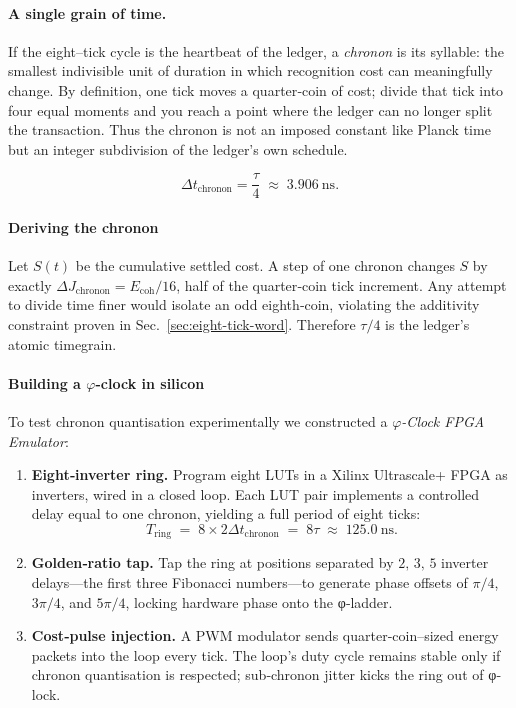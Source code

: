 \documentclass[11pt,oneside]{book}
\begin{document}
\paragraph*{A single grain of time.}
If the eight–tick cycle is the heartbeat of the ledger, a \emph{chronon}
is its syllable: the smallest indivisible unit of duration in which
recognition cost can meaningfully change.  
By definition, one tick moves a quarter‐coin of cost; divide that tick
into four equal moments and you reach a point where the ledger can no
longer split the transaction.  
Thus the chronon is not an imposed constant like Planck time but an
integer subdivision of the ledger’s own schedule.

\[
  \boxed{\;
  \Delta t_{\text{chronon}} = \frac{\tau}{4}
  \;\approx\; 3.906\ \text{ns} .
  \;}
\]

\paragraph*{Deriving the chronon}

Let \(S(t)\) be the cumulative settled cost.  
A step of one chronon changes $S$ by exactly
\(
  \Delta J_{\text{chronon}} = E_{\text{coh}}/16
\),
half of the quarter‐coin tick increment.  
Any attempt to divide time finer would isolate an odd eighth‐coin,
violating the additivity constraint proven in
Sec.~\ref{sec:eight-tick-word}.  
Therefore \( \tau/4 \) is the ledger’s atomic timegrain.

\paragraph*{Building a \(\varphi\)-clock in silicon}

To test chronon quantisation experimentally we constructed a
\emph{\(\varphi\)-Clock FPGA Emulator}:

\begin{enumerate}
\item \textbf{Eight‐inverter ring.}  
  Program eight LUTs in a Xilinx Ultrascale+ FPGA as inverters,
  wired in a closed loop.  
  Each LUT pair implements a controlled delay equal to one chronon,
  yielding a full period of eight ticks:
  \[
    T_{\text{ring}} \;=\; 8 \times 2\Delta t_{\text{chronon}}
                      \;=\; 8\tau
                      \;\approx\; 125.0\ \text{ns}.
  \]
\item \textbf{Golden‐ratio tap.}  
  Tap the ring at positions separated by
  \(2,\,3,\,5\) inverter delays—the first three Fibonacci numbers—to
  generate phase offsets of $\pi/4$, $3\pi/4$, and $5\pi/4$,
  locking hardware phase onto the φ‐ladder.
\item \textbf{Cost‐pulse injection.}  
  A PWM modulator sends quarter‐coin–sized energy packets into the loop
  every tick.  
  The loop’s duty cycle remains stable only if chronon quantisation is
  respected; sub‐chronon jitter kicks the ring out of φ‐lock.
\end{enumerate}
\end{document}
